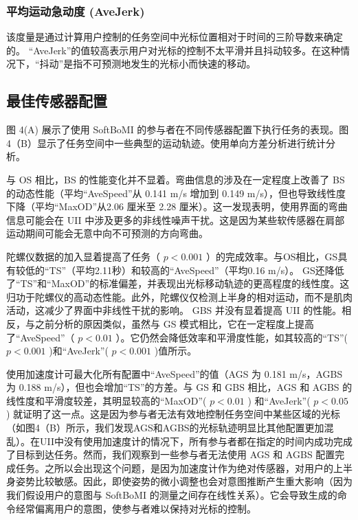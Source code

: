  \subsubsection{平均运动急动度 (AveJerk)  }    该度量是通过计算用户控制的任务空间中光标位置相对于时间的三阶导数来确定的。 “AveJerk”的值较高表示用户对光标的控制不太平滑并且抖动较多。在这种情况下，“抖动”是指不可预测地发生的光标小而快速的移动。  

\subsection{最佳传感器配置  }    图 4(A) 展示了使用 SoftBoMI 的参与者在不同传感器配置下执行任务的表现。图4（B）显示了任务空间中一些典型的运动轨迹。使用单向方差分析进行统计分析。  

与 OS 相比，BS 的性能变化并不显着。弯曲信息的涉及在一定程度上改善了 BS 的动态性能（平均“AveSpeed”从 0.141 m/s 增加到 0.149 m/s），但也导致线性度下降（平均“MaxOD”从2.06 厘米至 2.28 厘米）。这一发现表明，使用界面的弯曲信息可能会在 UII 中涉及更多的非线性噪声干扰。这是因为某些软传感器在肩部运动期间可能会无意中向不可预测的方向弯曲。  

陀螺仪数据的加入显着提高了任务（   $p<0.001$   ）的完成效率。与OS相比，GS具有较低的“TS”（平均2.11秒）和较高的“AveSpeed”（平均0.16 m/s）。 GS还降低了“TS”和“MaxOD”的标准偏差，并表现出光标移动轨迹的更高程度的线性度。这归功于陀螺仪的高动态性能。此外，陀螺仪仅检测上半身的相对运动，而不是肌肉活动，这减少了界面中非线性干扰的影响。 GBS 并没有显着提高 UII 的性能。相反，与之前分析的原因类似，虽然与 GS 模式相比，它在一定程度上提高了“AveSpeed”（   $p<0.01$   ）。它仍然会降低效率和平滑度性能，如其较高的“TS”(   $p<0.001$   )和“AveJerk”(   $p<0.001$   )值所示。  

使用加速度计可最大化所有配置中“AveSpeed”的值（AGS 为 0.181 m/s，AGBS 为 0.188 m/s），但也会增加“TS”的方差。与 GS 和 GBS 相比，AGS 和 AGBS 的线性度和平滑度较差，其明显较高的“MaxOD”(   $p<0.01$   ) 和“AveJerk”(   $p<0.05$   ) 就证明了这一点。这是因为参与者无法有效地控制任务空间中某些区域的光标（如图4（B）所示，我们发现AGS和AGBS的光标轨迹明显比其他配置更加混乱）。在UII中没有使用加速度计的情况下，所有参与者都在指定的时间内成功完成了目标到达任务。然而，我们观察到一些参与者无法使用 AGS 和 AGBS 配置完成任务。之所以会出现这个问题，是因为加速度计作为绝对传感器，对用户的上半身姿势比较敏感。因此，即使姿势的微小调整也会对意图推断产生重大影响（因为我们假设用户的意图与 SoftBoMI 的测量之间存在线性关系）。它会导致生成的命令经常偏离用户的意图，使参与者难以保持对光标的控制。  

